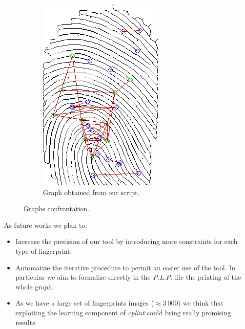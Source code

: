 \documentclass[8pt]{article}
\begin{document}
\begin{figure}
\begin{subfigure}{.48\textwidth}
		\includegraphics[width=0.86\linewidth]{img/plp-final}
		\caption{Graph obtained from our script.}
			\label{fig:concl-plp}
	\end{subfigure}%
	\caption{Graphs confrontation.}
	\label{fig:concl}
\end{figure}

As future works we plan to:
\begin{itemize}
	\item Increase the precision of our tool by introducing more constraints for each 
        type of fingerprint.
	\item Automatize the iterative procedure to permit an easier use of the tool. 
        In particular we aim to formalize directly in the \textit{P.L.P.} file the printing 
        of the whole graph.
	\item As we have a large set of fingerprints images ($\approx 3\ 000$) we think that 
        exploiting the learning component of \textit{cplint} could bring really promising results.
\end{itemize}
\end{document}
